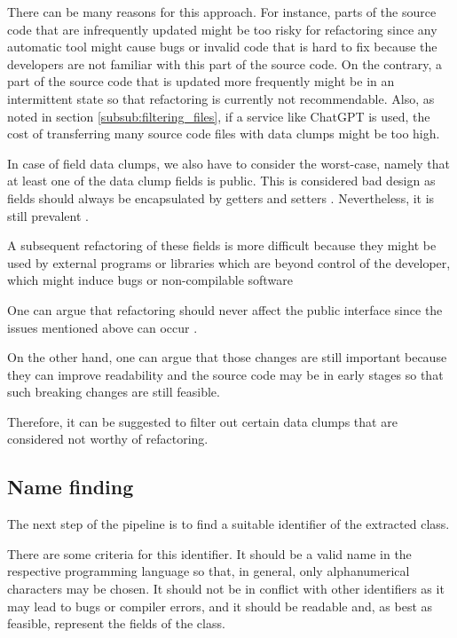 There can be many reasons for this approach. For instance, parts of the source code that are infrequently updated might be too risky for refactoring since any automatic tool might cause bugs or invalid code that is hard to fix because the developers are not familiar with this part of the source code. On the contrary, a part of the source code that is updated more frequently might be in an intermittent state so that refactoring is currently not recommendable. Also, as noted in section  \ref{subsub:filtering_files}, if a service like ChatGPT is used, the cost of transferring many source code files with data clumps might be too high. 

In case of field data clumps, we also have to consider the worst-case, namely that  at least one of the data clump fields is public. This is considered bad design as fields should always be encapsulated by getters and setters \cite{5680918}. Nevertheless, it is still prevalent \cite{5076631}.

A subsequent refactoring of these fields is more difficult because they might be used by external programs or libraries which are beyond control of the developer, which might induce bugs or non-compilable software 

One can argue that refactoring should never affect the public interface since the issues mentioned above can occur \cite{10.1145/1352678.1352681}.

On the other hand, one can argue that those changes are still important because they can improve readability and the source code may be in early stages so that such breaking changes are still feasible. 

Therefore, it can be suggested to filter out certain data clumps that are considered not worthy of refactoring.

\subsection{Name finding}\label{subsec:chap3_data_clump_name_finding}
The next step of the pipeline is to find a suitable identifier of the extracted class.

There are some criteria for this identifier. It should be a valid name in the respective programming language so that, in general, only alphanumerical characters may be chosen. It should not be  in conflict with other identifiers as it may lead to bugs or compiler errors, and it should be readable and, as best as feasible, represent the fields of the class.

